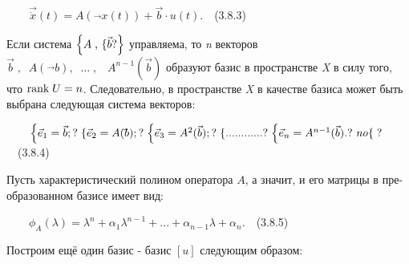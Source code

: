 \documentclass[a4paper]{article}
\newcommand\normalsubformula[1]{\text{\mathversion{normal}$#1$}}
\begin{document}
{\begin{russian}\sffamily
\ \ \ \  $\vec{\dot x}(t)=A(\vec{}x(t))+\vec b\cdot u(t)$.\ \ (3.8.3)
\end{russian}}

{\begin{russian}\sffamily
Если система  $\left\{A\;\text{,   \{}\vec{\normalsubformula b}?\right\}$ управляема, то \textit{n }векторов  $\vec
b\;,\;\;A(\vec{}b),\;\;...\;,\;\;\;A^{n-1}(\vec b)$ образуют базис в пространстве \textit{X} в силу того, что 
$\normalsubformula{\text{rank}}\;U=n$. Следовательно, в пространстве \textit{X} в качестве базиса может быть выбрана
следующая сис­тема векторов:
\end{russian}}

{\begin{russian}\sffamily
\ \ \ \  $\begin{matrix}\left\{\vec e_1=\vec b;?\right.\left\{\vec e_2=A(\vec{}b);?\right.\left\{\vec e_3=A^2(\vec
b);?\right.\left\{............?\right.\left\{\vec e_n=A^{n-1}(\vec b).?\right.\mathit{no}\hfill\null
\end{matrix}\{\;?$\ \ (3.8.4)
\end{russian}}

{\begin{russian}\sffamily
Пусть характеристический полином оператора  $A$, а значит, и его матрицы в преобразованном базисе имеет вид:
\end{russian}}

{\begin{russian}\sffamily
\ \ \ \  $ϕ_A\left(λ\right)=λ^n+α_1λ^{n-1}+...+α_{n-1}λ+α_n$.\ \ (3.8.5)
\end{russian}}

{\begin{russian}\sffamily
Построим ещё один базис - базис  $[u]$ следующим образом:
\end{russian}}
\end{document}
